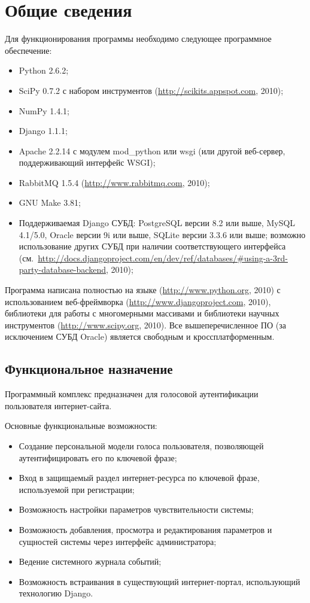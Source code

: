 \section{Общие сведения}
\label{sec:soft_description:general}

Для функционирования программы необходимо следующее программное обеспечение:
\begin{itemize}
\item Python 2.6.2;
\item SciPy 0.7.2 с набором инструментов  (\url{http://scikits.appspot.com}, 2010);
\item NumPy 1.4.1;
\item Django 1.1.1;
\item Apache 2.2.14 с модулем mod\_python или wsgi (или другой веб-сервер,
поддерживающий интерфейс WSGI);
\item RabbitMQ 1.5.4 (\url{http://www.rabbitmq.com}, 2010);
\item GNU Make 3.81;
\item Поддерживаемая Django СУБД: PostgreSQL версии 8.2 или выше, MySQL 4.1/5.0, Oracle версии 9i или выше, SQLite версии 3.3.6 или выше; возможно использование других СУБД при наличии соответствующего интерфейса (см.~\url{http://docs.djangoproject.com/en/dev/ref/databases/#using-a-3rd-party-database-backend}, 2010);
\end{itemize}

Программа написана полностью на языке  (\url{http://www.python.org}, 2010) с использованием веб-фреймворка  (\url{http://www.djangoproject.com}, 2010), библиотеки для работы с многомерными массивами  и библиотеки научных инструментов  (\url{http://www.scipy.org}, 2010). Все вышеперечисленное ПО (за исключением СУБД Oracle) является свободным и кроссплатформенным.

\subsection{Функциональное назначение}

Программный комплекс предназначен для голосовой аутентификации пользователя
интернет-сайта.

Основные функциональные возможности:
\begin{itemize}
\item Создание персональной модели голоса пользователя, позволяющей
аутентифицировать его по ключевой фразе;
\item Вход в защищаемый раздел интернет-ресурса по ключевой фразе, используемой
при регистрации;
\item Возможность настройки параметров чувствительности системы;
\item Возможность добавления, просмотра и редактирования параметров и сущностей
системы через интерфейс администратора;
\item Ведение системного журнала событий;
\item Возможность встраивания в существующий интернет-портал, использующий
технологию Django.
\end{itemize}

